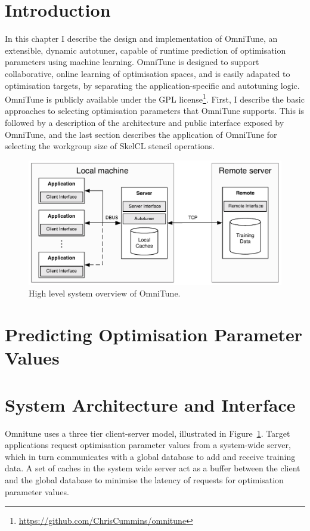 \section{Introduction}


In this chapter I describe the design and implementation of OmniTune,
an extensible, dynamic autotuner, capable of runtime prediction of
optimisation parameters using machine learning. OmniTune is designed
to support collaborative, online learning of optimisation spaces, and
is easily adapated to optimisation targets, by separating the
application-specific and autotuning logic. OmniTune is publicly
available under the GPL
license\footnote{\url{https://github.com/ChrisCummins/omnitune}}. First,
I describe the basic approaches to selecting optimisation parameters
that OmniTune supports. This is followed by a description of the
architecture and public interface exposed by OmniTune, and the last
section describes the application of OmniTune for selecting the
workgroup size of SkelCL stencil operations.


\begin{figure}
\centering
\includegraphics[width=.9\textwidth]{img/omnitune-system-overview.pdf}
\caption{%
  High level system overview of OmniTune.%
}
\label{fig:omnitune-system-overview}
\end{figure}


\section{Predicting Optimisation Parameter Values}


\section{System Architecture and Interface}


Omnitune uses a three tier client-server model, illustrated in
Figure~\ref{fig:omnitune-system-overview}. Target applications request
optimisation parameter values from a system-wide server, which in turn
communicates with a global database to add and receive training
data. A set of caches in the system wide server act as a buffer
between the client and the global database to minimise the latency of
requests for optimisation parameter values.


